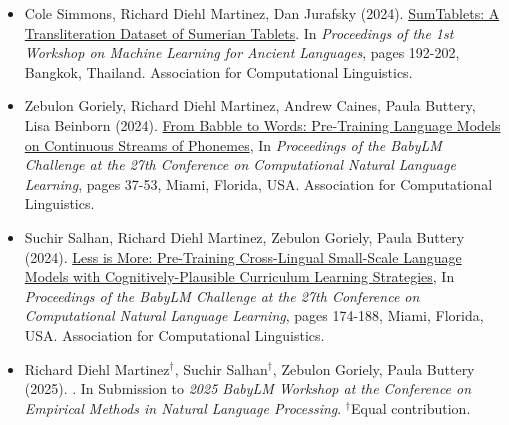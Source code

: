 \begin{tcolorbox}
\begin{itemize}
    \item Cole Simmons, Richard Diehl Martinez, Dan Jurafsky (2024). {\color{thesisblue}\href{https://aclanthology.org/2024.ml4al-1.20/}{SumTablets: A Transliteration Dataset of Sumerian Tablets}}. In \emph{Proceedings of the 1st Workshop on Machine Learning for Ancient Languages}, pages 192-202, Bangkok, Thailand. Association for Computational Linguistics.
    \item Zebulon Goriely, Richard Diehl Martinez, Andrew Caines, Paula Buttery, Lisa Beinborn (2024). {\color{thesisblue}\href{https://aclanthology.org/2024.conll-babylm.4/}{From Babble to Words: Pre-Training Language Models on Continuous Streams of Phonemes}}, In \emph{Proceedings of the BabyLM Challenge at the 27th Conference on Computational Natural Language Learning}, pages 37-53, Miami, Florida, USA. Association for Computational Linguistics.
    \item Suchir Salhan, Richard Diehl Martinez, Zebulon Goriely, Paula Buttery (2024). {\color{thesisblue}\href{https://aclanthology.org/2024.conll-babylm.15/}{Less is More: Pre-Training Cross-Lingual Small-Scale Language Models with Cognitively-Plausible Curriculum Learning Strategies}}, In \emph{Proceedings of the BabyLM Challenge at the 27th Conference on Computational Natural Language Learning}, pages 174-188, Miami, Florida, USA. Association for Computational Linguistics.
    \item  Richard Diehl Martinez$^{\dagger}$, Suchir Salhan$^{\dagger}$, Zebulon Goriely, Paula Buttery (2025). {}. In Submission to \emph{2025 BabyLM Workshop at the Conference on Empirical Methods in Natural Language Processing}. $^{\dagger}$Equal contribution.
\end{itemize}
\end{tcolorbox}